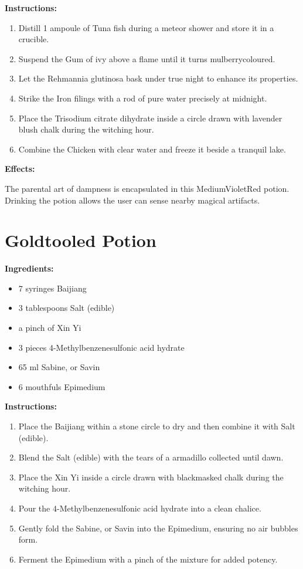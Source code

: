 \documentclass{article}
\begin{document}
\textbf{Instructions:}

\begin{enumerate}
  \item Distill 1 ampoule of Tuna fish during a meteor shower and store it in a crucible.
  \item Suspend the Gum of ivy above a flame until it turns mulberrycoloured.
  \item Let the Rehmannia glutinosa bask under true night to enhance its properties.
  \item Strike the Iron filings with a rod of pure water precisely at midnight.
  \item Place the Trisodium citrate dihydrate inside a circle drawn with lavender blush chalk during the witching hour.
  \item Combine the Chicken with clear water and freeze it beside a tranquil lake.
\end{enumerate}

\textbf{Effects:}

The parental art of dampness is encapsulated in this MediumVioletRed potion. Drinking the potion allows the user can sense nearby magical artifacts.

\newpage
\section*{Goldtooled Potion}

\textbf{Ingredients:}

\begin{itemize}
  \item 7 syringes Baijiang
  \item 3 tablespoons Salt (edible)
  \item a pinch of Xin Yi
  \item 3 pieces 4-Methylbenzenesulfonic acid hydrate
  \item 65 ml Sabine, or Savin
  \item 6 mouthfuls Epimedium
\end{itemize}

\textbf{Instructions:}

\begin{enumerate}
  \item Place the Baijiang within a stone circle to dry and then combine it with Salt (edible).
  \item Blend the Salt (edible) with the tears of a armadillo collected until dawn.
  \item Place the Xin Yi inside a circle drawn with blackmasked chalk during the witching hour.
  \item Pour the 4-Methylbenzenesulfonic acid hydrate into a clean chalice.
  \item Gently fold the Sabine, or Savin into the Epimedium, ensuring no air bubbles form.
  \item Ferment the Epimedium with a pinch of the mixture for added potency.
\end{enumerate}
\end{document}

